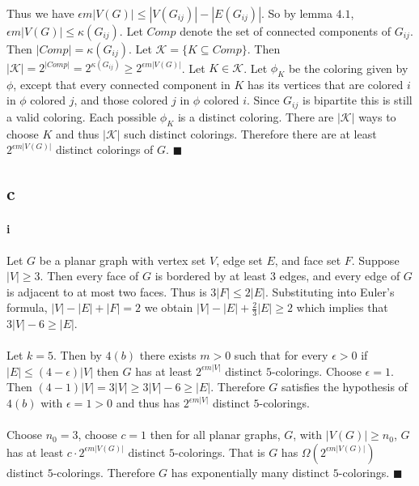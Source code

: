 \documentclass[letterpaper,12pt,oneside,onecolumn]{report}
\begin{document}
\paragraph{}
Thus we have $\epsilon m |V(G)| \leq |V(G_{ij})| - |E(G_{ij})|$. So by lemma $4.1$, $\epsilon m |V(G)| \leq \kappa(G_{ij})$. Let $Comp$ denote the set of connected components of $G_{ij}$. Then $|Comp| = \kappa(G_{ij})$. Let $\mathcal{K} = \{ K \subseteq Comp \}$. Then $|\mathcal{K}| = 2^{|Comp|} = 2^{\kappa(G_{ij})} \geq 2^{\epsilon m |V(G)|}$. Let $K \in \mathcal{K}$. Let $\phi_{K}$ be the coloring given by $\phi$, except that every connected component in $K$ has its vertices that are colored $i$ in $\phi$ colored $j$, and those colored $j$ in $\phi$ colored $i$. Since $G_{ij}$ is bipartite this is still a valid coloring. Each possible $\phi_{K}$ is a distinct coloring. There are $|\mathcal{K}|$ ways to choose $K$ and thus $|\mathcal{K}|$ such distinct colorings. Therefore there are at least $2^{\epsilon m |V(G)|}$ distinct colorings of $G$. $\blacksquare$
\subsection*{c}
\paragraph{i}
Let $G$ be a planar graph with vertex set $V$, edge set $E$, and face set $F$. Suppose $|V| \geq 3$. Then every face of $G$ is bordered by at least $3$ edges, and every edge of $G$ is adjacent to at most two faces. Thus is $3|F| \leq 2|E|$. Substituting into Euler's formula, $|V| - |E| + |F| = 2$ we obtain $|V| -|E| + \frac{2}{3}|E| \geq 2$ which implies that $3|V| - 6 \geq |E|$.
\paragraph{}
Let $k = 5$. Then by $4(b)$ there exists $m > 0$ such that for every $\epsilon > 0 $ if $|E| \leq (4 - \epsilon)|V|$ then $G$ has at least $2^{\epsilon m |V|}$ distinct $5$-colorings. Choose $\epsilon = 1$. Then $(4 - 1)|V| = 3|V|\geq 3|V| - 6 \geq |E|$. Therefore $G$ satisfies the hypothesis of $4(b)$ with $\epsilon = 1 > 0$ and thus has $2^{\epsilon m |V|}$ distinct $5$-colorings.
\paragraph{}
Choose $n_0 = 3$, choose $c = 1$ then for all planar graphs, $G$, with $|V(G)| \geq n_0$, $G$ has at least $c \cdot 2^{\epsilon m |V(G)|}$ distinct $5$-colorings. That is $G$ has $\Omega(2^{\epsilon m |V(G)|})$ distinct $5$-colorings. Therefore $G$ has exponentially many distinct $5$-colorings. $\blacksquare$
\end{document}
